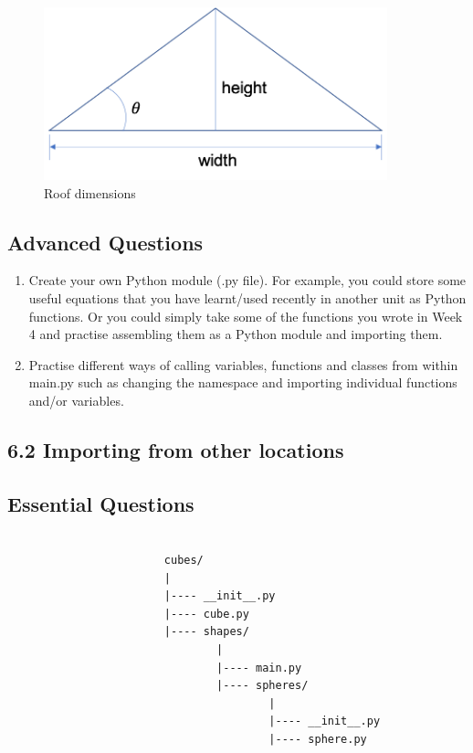 \documentclass[11pt]{report}
\begin{document}
\begin{figure}[!h]
        \centering
        \includegraphics[height=5cm]{roof}
        \caption{Roof dimensions}
        \label{fig:roof}
\end{figure}

\subsection*{Advanced Questions}

\begin{enumerate}[label=(\Alph*)]
    
    \item Create your own Python module (.py file). For example, you could store some useful equations that you have learnt/used recently in another unit as Python functions. Or you could simply take some of the functions you wrote in Week 4 and practise assembling them as a Python module and importing them.  
    \item Practise different ways of calling variables, functions and classes from within main.py such as changing the namespace and importing individual functions and/or variables. 
    
\end{enumerate}

\pagebreak

\subsection*{\Large 6.2 Importing from other locations}

\subsection*{Essential Questions}

\begin{verbatim}

                        cubes/
                        |
                        |---- __init__.py
                        |---- cube.py
                        |---- shapes/
                                |
                                |---- main.py
                                |---- spheres/
                                        |
                                        |---- __init__.py
                                        |---- sphere.py
                                        
\end{verbatim}
\end{document}
